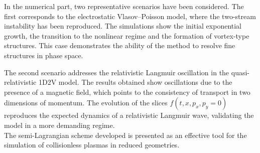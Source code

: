 \documentclass[11pt,a4paper,twoside,pdf]{article}
\numberwithin{equation}{section}
\begin{document}
In the numerical part, two representative scenarios have been considered. The
first corresponds to the electrostatic Vlasov--Poisson model, where the
two-stream instability has been reproduced. The simulations show the
initial exponential growth, the transition to the nonlinear regime and the
formation of vortex-type structures. This case demonstrates the ability of the method to resolve
fine structures in phase space.

The second scenario addresses the relativistic Langmuir oscillation in the
quasi-relativistic 1D2V model. The results obtained show oscillations due to the presence of a magnetic field, which points to the consistency of transport in two
dimensions of momentum. The evolution of the slices $f(t,x,p_x,p_y=0)$
reproduces the expected dynamics of a relativistic Langmuir wave, validating the
model in a more demanding regime.\\

The semi-Lagrangian scheme developed is presented as an
effective tool for the simulation of collisionless plasmas in reduced
geometries.







\newpage






\end{document}
